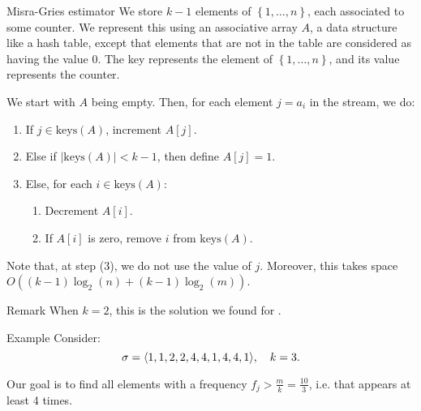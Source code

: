 \documentclass[a4paper]{article}
\begin{document}
\begin{parag}{Misra-Gries estimator}
    We store $k-1$ elements of $\left\{1, \ldots, n\right\}$, each associated to some counter. We represent this using an associative array $A$, a data structure like a hash table, except that elements that are not in the table are considered as having the value $0$. The key represents the element of $\left\{1, \ldots, n\right\}$, and its value represents the counter.

    We start with $A$ being empty. Then, for each element $j = a_i$ in the stream, we do:
    \begin{enumerate}
        \item If $j \in \text{keys}\left(A\right)$, increment $A\left[j\right]$.
        \item Else if $\left|\text{keys}\left(A\right)\right| < k-1$, then define $A\left[j\right] = 1$.
        \item Else, for each $i \in \text{keys}\left(A\right)$:
            \begin{enumerate}[left=0pt]
                \item Decrement $A\left[i\right]$.
                \item If $A\left[i\right]$ is zero, remove $i$ from $\text{keys}\left(A\right)$.
            \end{enumerate}
    \end{enumerate}

    Note that, at step (3), we do not use the value of $j$. Moreover, this takes space $O\left(\left(k-1\right)\log_2\left(n\right) + \left(k-1\right)\log_2\left(m\right)\right)$. 

    \begin{subparag}{Remark}
        When $k = 2$, this is the solution we found for .
    \end{subparag}

    \begin{subparag}{Example}
        Consider:
        \[\sigma = \left\langle 1, 1, 2, 2, 4, 4, 1, 4, 4, 1 \right\rangle, \mathspace k = 3.\]

        Our goal is to find all elements with a frequency $f_j > \frac{m}{k} = \frac{10}{3}$, i.e. that appears at least 4 times.


\end{subparag}
\end{parag}
\end{document}
